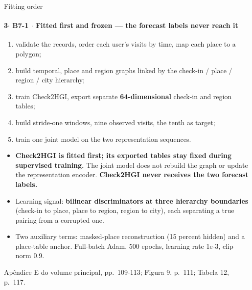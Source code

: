 \documentclass{beamer}
\begin{document}
\begin{frame}[noframenumbering]{Fitting order}
    \framesubtitle{\normalsize 3$\cdot$ \textbf{B7-1} $\cdot$ Fitted first and frozen --- the forecast labels never reach it}
    \hypertarget{b71}{}
    \small
    \begin{enumerate}\footnotesize\setlength{\itemsep}{0pt}\setlength{\parskip}{0pt}
        \item validate the records, order each user's visits by time, map each place to a polygon;
        \item build temporal, place and region graphs linked by the check-in / place / region / city hierarchy;
        \item train Check2HGI, export separate \textbf{64-dimensional} check-in and region tables;
        \item build stride-one windows, nine observed visits, the tenth as target;
        \item train one joint model on the two representation sequences.
    \end{enumerate}
    \begin{itemize}\setlength{\itemsep}{0pt}\setlength{\parskip}{0pt}
        \item \textcolor{alert}{\textbf{Check2HGI is fitted first; its exported tables stay fixed during supervised training.}} The joint model does not rebuild the graph or update the representation encoder. \textbf{Check2HGI never receives the two forecast labels.}
        \item Learning signal: \textbf{bilinear discriminators at three hierarchy boundaries} (check-in to place, place to region, region to city), each separating a true pairing from a corrupted one.
        \item Two auxiliary terms: masked-place reconstruction (15 percent hidden) and a place-table anchor. Full-batch Adam, 500 epochs, learning rate 1e-3, clip norm 0.9.
    \end{itemize}
    \vfill
    {\scriptsize
    \begin{minipage}[b]{0.775\linewidth}\raggedright\textcolor{black!70}{Apêndice E do volume principal, pp.~109-113; Figura 9, p.~111; Tabela 12, p.~117.}\end{minipage}\hfill
    \begin{minipage}[b]{0.20\linewidth}\raggedleft \hyperlink{b0}{}\end{minipage}}
\end{frame}
\end{document}
